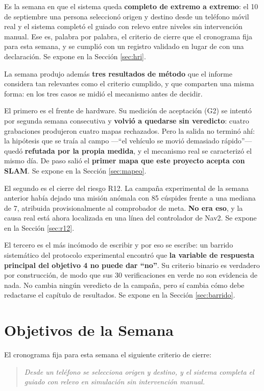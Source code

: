 \documentclass[12pt,letterpaper]{article}
\begin{document}
Es la semana en que el sistema queda \textbf{completo de extremo a extremo}: el 10 de septiembre una persona seleccionó origen y destino desde un teléfono móvil real y el sistema completó el guiado con relevo entre niveles sin intervención manual. Ese es, palabra por palabra, el criterio de cierre que el cronograma fija para esta semana, y se cumplió con un registro validado en lugar de con una declaración. Se expone en la Sección \ref{sec:hri}.

La semana produjo además \textbf{tres resultados de método} que el informe considera tan relevantes como el criterio cumplido, y que comparten una misma forma: en los tres casos se midió el mecanismo antes de decidir.

El primero es el frente de hardware. Su medición de aceptación (G2) se intentó por segunda semana consecutiva y \textbf{volvió a quedarse sin veredicto}: cuatro grabaciones produjeron cuatro mapas rechazados. Pero la salida no terminó ahí: la hipótesis que se traía al campo ---``el vehículo se movió demasiado rápido''--- quedó \textbf{refutada por la propia medida}, y el mecanismo real se caracterizó el mismo día. De paso salió el \textbf{primer mapa que este proyecto acepta con SLAM}. Se expone en la Sección \ref{sec:mapeo}.

El segundo es el cierre del riesgo R12. La campaña experimental de la semana anterior había dejado una misión anómala con 85 cúspides frente a una mediana de 7, atribuida provisionalmente al comprobador de meta. \textbf{No era eso}, y la causa real está ahora localizada en una línea del controlador de Nav2. Se expone en la Sección \ref{sec:r12}.

El tercero es el más incómodo de escribir y por eso se escribe: un barrido sistemático del protocolo experimental encontró que \textbf{la variable de respuesta principal del objetivo 4 no puede dar ``no''}. Su criterio binario es verdadero por construcción, de modo que sus 30 verificaciones en verde no son evidencia de nada. No cambia ningún veredicto de la campaña, pero sí cambia cómo debe redactarse el capítulo de resultados. Se expone en la Sección \ref{sec:barrido}.

\section{Objetivos de la Semana}

El cronograma fija para esta semana el siguiente criterio de cierre:

\begin{quote}
\textit{Desde un teléfono se selecciona origen y destino, y el sistema completa el guiado con relevo en simulación sin intervención manual.}
\end{quote}
\end{document}
